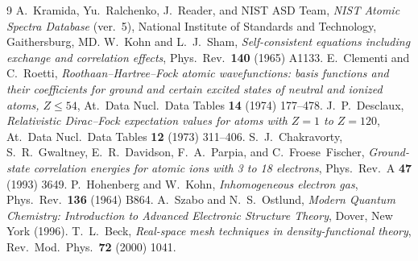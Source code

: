 \documentclass[11pt]{article}
\providecommand{\DIFaddend}{} %
\DeclareRobustCommand{\DIFaddend}{\DIFOaddend \let\includegraphics\DIFOincludegraphics} %
\begin{document}
\begin{thebibliography}{9}
\DIFaddend {} A.~Kramida, Yu.~Ralchenko, J.~Reader, and NIST ASD Team,
\emph{NIST Atomic Spectra Database} (ver.\ 5), National Institute of Standards and
Technology, Gaithersburg, MD.
 W.~Kohn and L.~J.~Sham, \emph{Self-consistent equations including
exchange and correlation effects}, Phys.\ Rev.\ \textbf{140} (1965) A1133.
 E.~Clementi and C.~Roetti, \emph{Roothaan--Hartree--Fock
atomic wavefunctions: basis functions and their coefficients for ground and certain
excited states of neutral and ionized atoms, $Z\le54$}, At.\ Data Nucl.\ Data Tables
\textbf{14} (1974) 177--478.
 J.~P.~Desclaux, \emph{Relativistic Dirac--Fock expectation values
for atoms with $Z=1$ to $Z=120$}, At.\ Data Nucl.\ Data Tables \textbf{12} (1973)
311--406.
 S.~J.~Chakravorty, S.~R.~Gwaltney, E.~R.~Davidson,
F.~A.~Parpia, and C.~Froese~Fischer, \emph{Ground-state correlation energies for
atomic ions with 3 to 18 electrons}, Phys.\ Rev.\ A \textbf{47} (1993) 3649.
 P.~Hohenberg and W.~Kohn, \emph{Inhomogeneous electron gas},
Phys.\ Rev.\ \textbf{136} (1964) B864.
 A.~Szabo and N.~S.~Ostlund, \emph{Modern Quantum Chemistry:
Introduction to Advanced Electronic Structure Theory}, Dover, New York (1996).
 T.~L.~Beck, \emph{Real-space mesh techniques in density-functional
theory}, Rev.\ Mod.\ Phys.\ \textbf{72} (2000) 1041.
\end{thebibliography}
\end{document}
